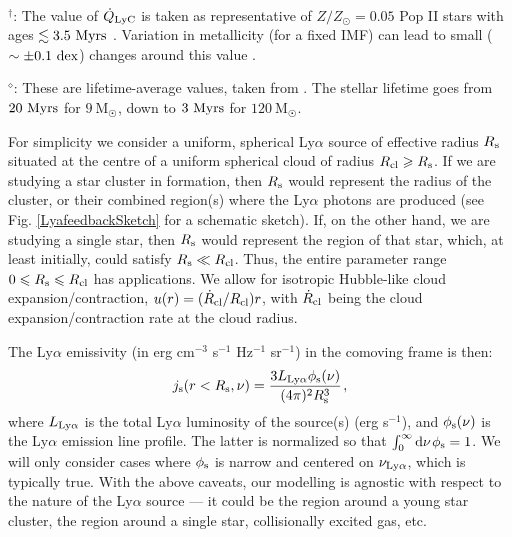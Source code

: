 \documentclass[fleqn,usenatbib]{mnras}
\newcommand\Msun{\text{M}_{\astrosun}} %
\newcommand\HI{\ion{H}{I}\xspace} %
\newcommand\HII{\ion{H}{II}\xspace} %
\begin{document}
\begin{table}
\begin{tabular}{l c}
\\

\hline
\hline
\end{tabular}
\vspace{1 pt}\\
$^\dagger$: The value of $\Dot{Q}_{\rm LyC}$ is taken as representative of $Z/Z_{\odot} = 0.05$ Pop II stars with ages $\lesssim 3.5 ~ \rm Myrs$ \citep[see e.g.][]{Ma2016, Rosdahl2018}. Variation in metallicity (for a fixed IMF) can lead to small ($\sim \pm 0.1 ~ \rm dex$) changes around this value \citep[e.g.][]{Stanway2019, Deng2024}.

$^{\diamond}$: These are lifetime-average values, taken from \cite{Klessen2023}. The stellar lifetime goes from $20 ~ \rm Myrs$ for $9 ~ \Msun$, down to $3 ~ \rm Myrs$ for $120 ~ \Msun$.
\label{Qdot}
\end{table}

For simplicity we consider a uniform, spherical Ly$\alpha$ source of effective radius $R_{\rm s}$ situated at the centre of a uniform spherical cloud of radius $R_{\rm cl} \geq R_{\rm s}$. If we are studying a star cluster in formation, then $R_{\rm s}$ would represent the radius of the cluster, or their combined \HII region(s) where the Ly$\alpha$ photons are produced (see Fig. \ref{LyafeedbackSketch} for a schematic sketch). If, on the other hand, we are studying a single star, then $R_{\rm s}$ would represent the \HII region of that star, which, at least initially, could satisfy $R_{\rm s} \ll R_{\rm cl}$. Thus, the entire parameter range $0 \leq R_{\rm s} \leq R_{\rm cl}$ has applications. We allow for isotropic Hubble-like cloud expansion/contraction, $u(r) = (\Dot{R}_{\rm cl}/R_{\rm cl})r$, with $\Dot{R}_{\rm cl}$ being the cloud expansion/contraction rate at the cloud radius. 

The Ly$\alpha$ emissivity (in erg cm$^{-3}$ s$^{-1}$ Hz$^{-1}$ sr$^{-1}$) in the comoving frame is then:
\begin{equation}
    j_{\rm s}(r < R_{\rm s}, \nu) = \dfrac{3 L_{\rm Ly\alpha} \phi_{\rm s}(\nu)}{(4 \pi)^2 R_{\rm s}^3} \hspace{1 pt} \label{js},
\end{equation}
where $L_{\rm Ly\alpha}$ is the total Ly$\alpha$ luminosity of the source(s) (erg s$^{-1}$), and $\phi_{\rm s}(\nu)$ is the Ly$\alpha$ emission line profile. The latter is normalized so that $\int_{0}^{\infty} \textrm{d}\nu \hspace{1 pt} \phi_{\rm s} = 1$. We will only consider cases where $\phi_{\rm s}$ is narrow and centered on $\nu_{\rm Ly\alpha}$, which is typically true. With the above caveats, our modelling is agnostic with respect to the nature of the Ly$\alpha$ source --- it could be the \HII region around a young star cluster, the \HII region around a single star, collisionally excited \HI gas, etc.
\end{document}
